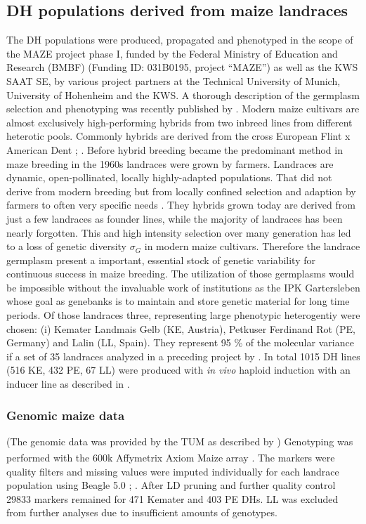 \subsection{DH populations derived from maize  landraces}
The DH populations were produced, propagated and phenotyped in the scope of the MAZE project phase I, funded
by the Federal Ministry of Education and Research (BMBF) (Funding ID: 031B0195, project “MAZE”) as well as the
KWS SAAT SE, by various project partners at the Technical University of Munich, University of Hohenheim and
the KWS. A thorough description of the germplasm selection and phenotyping was recently published by
\cite{holker2019european}. \newline Modern maize cultivars are almost exclusively high-performing hybrids from
two inbreed lines from different heterotic pools. Commonly hybrids are derived from the cross European Flint x
American Dent \cite{dos2004priori}; \cite{brauner2019testcross}. Before hybrid breeding became the predominant
method in maze breeding in the 1960s landraces were grown by farmers. Landraces are dynamic, open-pollinated,
locally highly-adapted populations. That did not derive from modern breeding but from locally confined
selection and adaption by farmers to often very specific needs \cite{arteaga2016genomic}. They hybrids grown
today are derived from just a few landraces as founder lines, while the majority of landraces has been nearly
forgotten. This and high intensity selection over many generation has led to a loss of genetic diversity
$\sigma_G$ in modern maize cultivars. Therefore the landrace germplasm present a important, essential stock of
genetic variability for continuous success in maize breeding. The utilization of those germplasms would be
impossible without the invaluable work of institutions as the IPK Gartersleben whose goal as genebanks is to
maintain and store genetic material for long time periods.  Of those landraces three, representing large
phenotypic heterogentiy were chosen: (i) Kemater Landmais Gelb (KE, Austria), Petkuser Ferdinand Rot (PE,
Germany) and Lalin (LL, Spain). They represent 95 \% of the molecular variance if a set of
35 landraces analyzed in a preceding project by \cite{mayer2017there}.\newline
In total 1015 DH lines (516 KE, 432 PE, 67 LL) were produced with \textit{in vivo} haploid induction with an inducer line as described in \cite{roeber2005vivo}.


\subsubsection{Genomic maize data}
(The genomic data was provided by the TUM as described by \cite{holker2019european}) \newline Genotyping was
performed with the 600k Affymetrix\textsuperscript{\textregistered} Axiom\textsuperscript{\textregistered}
Maize array \cite{unterseer2014powerful}. The markers were quality filters and missing values were imputed
individually for each landrace population using Beagle 5.0 \cite{browning2007rapid};
\cite{browning2018one}. After LD pruning and further quality control 29833 markers remained for 471 Kemater
and 403 PE DHs. LL was excluded from further analyses due to insufficient amounts of genotypes.

